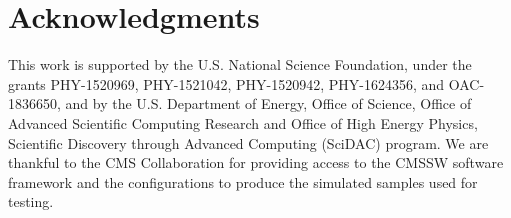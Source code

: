 \documentclass[a4paper,11pt]{article}
\begin{document}
\section*{Acknowledgments}

This work is supported by the U.S. National Science Foundation, under the grants PHY-1520969, PHY-1521042, PHY-1520942, PHY-1624356, and OAC-1836650, and by the U.S. Department of Energy, Office of Science, Office of Advanced Scientific Computing Research and Office of High Energy Physics, Scientific Discovery through Advanced Computing (SciDAC) program. We are thankful to the CMS Collaboration for providing access to the CMSSW software framework and the configurations to produce the simulated samples used for testing.

%
%
\end{document}
